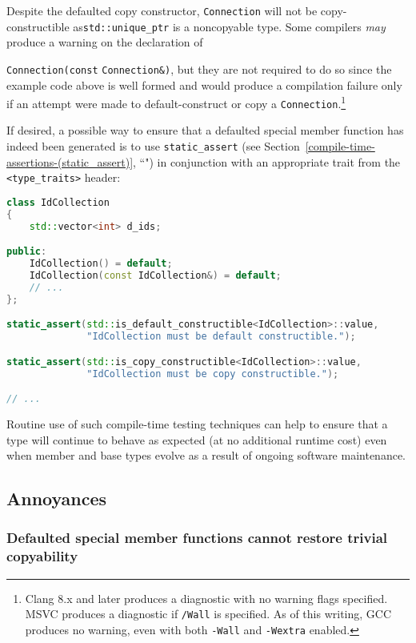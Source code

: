 \noindent Despite the defaulted copy constructor, \texttt{Connection} will not be
copy-constructible as\linebreak[4] \texttt{std::unique\_ptr} is a noncopyable type.
Some compilers \emph{may} produce a warning on the declaration of
{\texttt{Connection(const} \texttt{Connection\&)}, but they are not
required to do so since the example code above is well formed and would produce a
compilation failure only if an attempt were made to default-construct or
copy a \texttt{Connection}.{\cprotect\footnote{Clang 8.x
and later produces a diagnostic with no warning flags specified.
MSVC produces a diagnostic if \texttt{/Wall} is specified. As of this writing, GCC produces no warning, even with both
  \texttt{-Wall} and \texttt{-Wextra} enabled.}}

If desired, a possible way to ensure that a defaulted special member
function has indeed been generated is to use
{\texttt{static\_assert}} (see Section~\ref{compile-time-assertions-(static_assert)}, ``")
in conjunction with an
appropriate trait from the \texttt{<type\_traits>} header:

\begin{lstlisting}[language=C++]
class IdCollection
{
    std::vector<int> d_ids;

public:
    IdCollection() = default;
    IdCollection(const IdCollection&) = default;
    // ...
};

static_assert(std::is_default_constructible<IdCollection>::value,
              "IdCollection must be default constructible.");

static_assert(std::is_copy_constructible<IdCollection>::value,
              "IdCollection must be copy constructible.");

// ...
\end{lstlisting}

\noindent Routine use of such compile-time testing techniques can help to ensure
that a type will continue to behave as expected (at no additional
runtime cost) even when member and base types evolve as a result
of ongoing software maintenance.

\subsection{Annoyances}

\subsubsection[Defaulted special member functions cannot restore trivial copyability]{Defaulted special member functions cannot restore trivial copyability}

}
